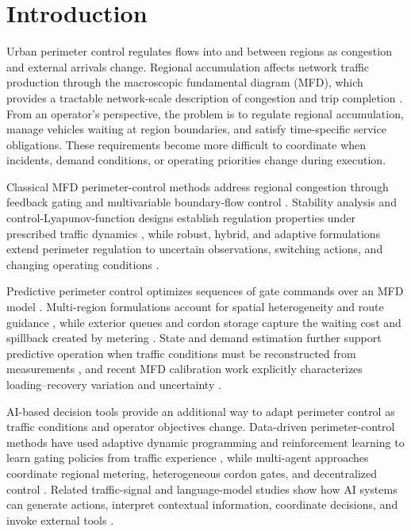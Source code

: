 \documentclass[preprint,12pt]{elsarticle}
\begin{document}
\section{Introduction}
\label{sec:new-introduction}

Urban perimeter control regulates flows into and between regions as
congestion and external arrivals change. Regional accumulation affects
network traffic production through the macroscopic fundamental diagram
(MFD), which provides a tractable network-scale description of congestion
and trip completion
\cite{daganzo2007gridlock,geroliminis2008existence,daganzo2008analytical,geroliminis2011properties,leclercq2014cross}.
From an operator's perspective, the problem is to regulate regional
accumulation, manage vehicles waiting at region boundaries, and satisfy
time-specific service obligations. These requirements become more difficult
to coordinate when incidents, demand conditions, or operating priorities
change during execution.

Classical MFD perimeter-control methods address regional congestion through
feedback gating and multivariable boundary-flow control
\cite{keyvan2012gating,aboudolas2013perimeter}. Stability analysis and
control-Lyapunov-function designs establish regulation properties under
prescribed traffic dynamics \cite{haddad2012stability,zhong2018robust},
while robust, hybrid, and adaptive formulations extend perimeter regulation
to uncertain observations, switching actions, and changing operating
conditions
\cite{mohajerpoor2020hinf,hajiahmadi2015hybrid,haddad2020adaptive,kouvelas2017adaptive}.

Predictive perimeter control optimizes sequences of gate commands over an
MFD model \cite{geroliminis2013mpc}. Multi-region formulations account for
spatial heterogeneity and route guidance
\cite{ramezani2015heterogeneity,sirmatel2018economic}, while exterior queues
and cordon storage capture the waiting cost and spillback created by
metering \cite{haddad2017queues,ni2019cordon}. State and demand estimation
further support predictive operation when traffic conditions must be
reconstructed from measurements \cite{sirmatel2019estimation}, and recent
MFD calibration work explicitly characterizes loading--recovery variation
and uncertainty \cite{ma2025mfduq}.

AI-based decision tools provide an additional way to adapt perimeter control
as traffic conditions and operator objectives change. Data-driven
perimeter-control methods have used adaptive dynamic programming and
reinforcement learning to learn gating policies from traffic experience
\cite{chen2022dataefficient,chen2024iadp}, while multi-agent approaches
coordinate regional metering, heterogeneous cordon gates, and decentralized
control \cite{zhou2023scalable,yu2025physicsperimeter,li2024beyond}. Related
traffic-signal and language-model studies show how AI systems can generate
actions, interpret contextual information, coordinate decisions, and invoke
external tools
\cite{wei2019presslight,wei2019colight,llmlight2023,masri2025llmtraffic,collmlight2025,trafficgpt2024,openti2024,virtualpolice2026,yu2025statespace}.
\end{document}
